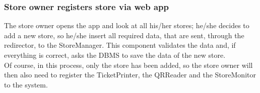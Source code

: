 \subsubsection{Store owner registers store via web app}
\begin{figure}[H]
	\noindent
\end{figure}
The store owner opens the app and look at all his/her stores; he/she decides to add a new store, so he/she insert all required data, that are sent, through the redirector, to the StoreManager. This component validates the data and, if everything is correct, asks the DBMS to save the data of the new store.\\
Of course, in this process, only the store has been added, so the store owner will then also need to register the TicketPrinter, the QRReader and the StoreMonitor to the system.
